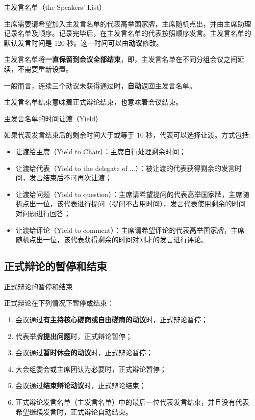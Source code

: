 \documentclass{beamer}
\begin{document}
\begin{frame}{主发言名单（the Speakers’ List）}

主席需要请希望加入主发言名单的代表高举国家牌，主席随机点出，并由主席助理记录名单及顺序。记录完毕后，在主发言名单的代表按照顺序发言。主发言名单的默认发言时间是 120 秒。这一时间可以由\textbf{动议}修改。

主发言名单将\textbf{一直保留到会议全部结束}，即，主发言名单在不同分组会议之间延续，不需要重新设置。

一般而言，连续三个动议未获得通过时，\textbf{自动}返回主发言名单。

主发言名单结束意味着正式辩论结束，也意味着会议结束。

\end{frame}

\begin{frame}{主发言名单的时间让渡（Yield）}

如果代表发言结束后的剩余时间大于或等于 10 秒，代表可以选择让渡。方式包括:
\begin{itemize}
\item 让渡给主席（Yield to Chair）：主席自行处理剩余时间；
\item 让渡给代表（Yield to the delegate of ...）：被让渡的代表获得剩余的发言时间，发言结束后不可再次让渡；
\item 让渡给问题（Yield to question）：主席请希望提问的代表高举国家牌，主席随机点出一位，该代表进行提问（提问不占用时间），发言代表使用剩余的时间对问题进行回答；
\item 让渡给评论（Yield to comment）：主席请希望评论的代表高举国家牌，主席随机点出一位，该代表获得剩余的时间对刚才的发言进行评论。
\end{itemize}

\end{frame}

\subsection{正式辩论的暂停和结束}

\begin{frame}{正式辩论的暂停和结束}

正式辩论在下列情况下暂停或结束：

\begin{enumerate}
\item 会议通过\textbf{有主持核心磋商或自由磋商的动议}时，正式辩论暂停；
\item 代表举牌\textbf{提出问题}时，正式辩论暂停；
\item 会议通过\textbf{暂时休会的动议}时，正式辩论暂停；
\item 大会组委会或主席团认为必要时，正式辩论暂停；
\item 会议通过\textbf{结束辩论动议}时，正式辩论结束；
\item 正式辩论发言名单（主发言名单）中的最后一位代表发言结束，并且没有代表希望继续发言时，正式辩论自动结束。
\end{enumerate}

\end{frame}
\end{document}
